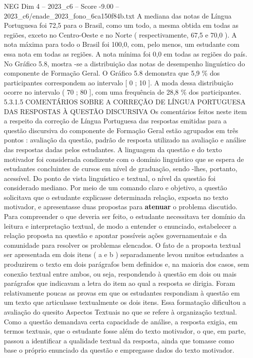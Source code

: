 \begin{textsample}{NEG Dim 4 – 2023\_c6 – Score -9.00 – 2023\_c6/enade\_2023\_fono\_6ca150f84b.txt}
A mediana das notas de Língua Portuguesa foi 72,5 para o Brasil, como um todo, a mesma obtida em todas as regiões, exceto no Centro-Oeste e no Norte ( respectivamente, 67,5 e 70,0 ).
A nota máxima para todo o Brasil foi 100,0, com, pelo menos, um estudante com essa nota em todas as regiões.
A nota mínima foi 0,0 em todas as regiões do país.
No Gráfico 5.8, mostra -se a distribuição das notas de desempenho linguístico do componente de Formação Geral.
O Gráfico 5.8 demonstra que 5,9 \% dos participantes correspondem ao intervalo [ 0 ; 10 ].
A moda dessa distribuição ocorre no intervalo ( 70 ; 80 ], com uma frequência de 28,8 \% dos participantes. 5.3.1.5 COMENTÁRIOS SOBRE A CORREÇÃO DE LÍNGUA PORTUGUESA DAS RESPOSTAS À QUESTÃO DISCURSIVA Os comentários feitos neste item a respeito da correção de Língua Portuguesa das respostas emitidas para a questão discursiva do componente de Formação Geral estão agrupados em três pontos : avaliação da questão, padrão de resposta utilizado na avaliação e análise das respostas dadas pelos estudantes.
A linguagem da questão e do texto motivador foi considerada condizente com o domínio linguístico que se espera de estudantes concluintes de cursos em nível de graduação, sendo -lhes, portanto, acessível.
Do ponto de vista linguístico e textual, o nível da questão foi considerado mediano.
Por meio de um comando claro e objetivo, a questão solicitava que o estudante explicasse determinada relação, exposta no texto motivador, e apresentasse duas propostas para \textbf{atenuar} o problema discutido.
Para compreender o que deveria ser feito, o estudante necessitava ter domínio da leitura e interpretação textual, de modo a entender o enunciado, estabelecer a relação proposta na questão e apontar possíveis ações governamentais e da comunidade para resolver os problemas elencados.
O fato de a proposta textual ser apresentada em dois itens ( a e b ) separadamente levou muitos estudantes a produzirem o texto em dois parágrafos bem definidos e, na maioria dos casos, sem conexão textual entre ambos, ou seja, respondendo à questão em dois ou mais parágrafos que indicavam a letra do item ao qual a resposta se dirigia.
Foram relativamente poucas as provas em que os estudantes respondiam à questão em um texto que articulasse textualmente os dois itens.
Essa formatação dificultou a avaliação do quesito Aspectos Textuais no que se refere à organização textual.
Como a questão demandava certa capacidade de análise, a resposta exigia, em termos textuais, que o estudante fosse além do texto motivador, o que, em parte, passou a identificar a qualidade textual da resposta, ainda que tomasse como base o próprio enunciado da questão e empregasse dados do texto motivador.

\end{textsample}
